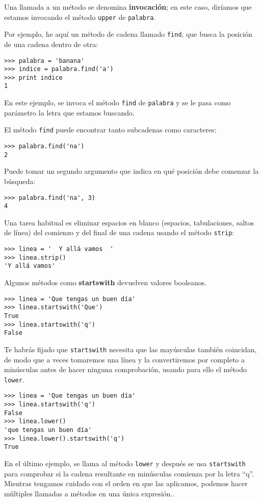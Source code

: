 
Una llamada a un método se denomina {\bf invocación}; en este caso, diríamos
que estamos invocando el método {\tt upper} de {\tt palabra}.


Por ejemplo, he aquí un método de cadena llamado {\tt find}, que
busca la posición de una cadena dentro de otra:

\beforeverb
\begin{verbatim}
>>> palabra = 'banana'
>>> indice = palabra.find('a')
>>> print indice
1
\end{verbatim}
\afterverb
%
En este ejemplo, se invoca el método {\tt find} de {\tt palabra} y se le
pasa como parámetro la letra que estamos buscando.

El método {\tt find} puede encontrar tanto subcadenas como caracteres:

\beforeverb
\begin{verbatim}
>>> palabra.find('na')
2
\end{verbatim}
\afterverb
%
Puede tomar un segundo argumento que indica en qué posición debe comenzar la búsqueda:


\beforeverb
\begin{verbatim}
>>> palabra.find('na', 3)
4
\end{verbatim}
\afterverb
%
Una tarea habitual es eliminar espacios en blanco (espacios, tabulaciones, saltos de línea)
del comienzo y del final de una cadena usando el método {\tt strip}:

\beforeverb
\begin{verbatim}
>>> linea = '  Y allá vamos  '
>>> linea.strip()
'Y allá vamos'
\end{verbatim}
\afterverb
%
Algunos métodos como {\bf startswith} devuelven valores booleanos.

\beforeverb
\begin{verbatim}
>>> linea = 'Que tengas un buen día'
>>> linea.startswith('Que')
True
>>> linea.startswith('q')
False
\end{verbatim}
\afterverb
%
Te habrás fijado que {\tt startswith} necesita que las mayúsculas también coincidan, de modo
que a veces tomaremos una línea y la convertiremos por completo a minúsculas antes de hacer
ninguna comprobación, usando para ello el método {\tt lower}.

\beforeverb
\begin{verbatim}
>>> linea = 'Que tengas un buen día'
>>> linea.startswith('q')
False
>>> linea.lower()
'que tengas un buen día'
>>> linea.lower().startswith('q')
True
\end{verbatim}
\afterverb
%
En el último ejemplo, se llama al método {\tt lower}
y después se usa {\tt startswith} para comprobar
si la cadena resultante en minúsculas
comienza por la letra ``q''. Mientras tengamos cuidado
con el orden en que las aplicamos, podemos hacer múltiples
llamadas a métodos en una única expresión..

